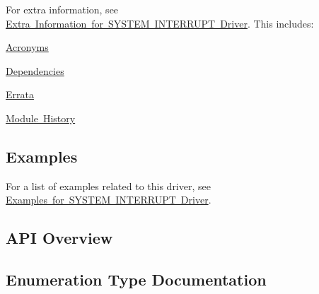For extra information, see \mbox{\hyperlink{asfdoc_sam0_system_interrupt_extra}{Extra Information for S\+Y\+S\+T\+EM I\+N\+T\+E\+R\+R\+U\+PT Driver}}. This includes\+:
\begin{DoxyItemize}
\item \mbox{\hyperlink{asfdoc_sam0_system_interrupt_extra_asfdoc_sam0_system_interrupt_extra_acronyms}{Acronyms}}
\item \mbox{\hyperlink{asfdoc_sam0_system_interrupt_extra_asfdoc_sam0_system_interrupt_extra_dependencies}{Dependencies}}
\item \mbox{\hyperlink{asfdoc_sam0_system_interrupt_extra_asfdoc_sam0_system_interrupt_extra_errata}{Errata}}
\item \mbox{\hyperlink{asfdoc_sam0_system_interrupt_extra_asfdoc_sam0_system_interrupt_extra_history}{Module History}}
\end{DoxyItemize}\hypertarget{group__asfdoc__sam0__system__interrupt__group_asfdoc_sam0_system_interrupt_examples}{}\subsection{Examples}\label{group__asfdoc__sam0__system__interrupt__group_asfdoc_sam0_system_interrupt_examples}
For a list of examples related to this driver, see \mbox{\hyperlink{asfdoc_sam0_system_interrupt_exqsg}{Examples for S\+Y\+S\+T\+EM I\+N\+T\+E\+R\+R\+U\+PT Driver}}.\hypertarget{group__asfdoc__sam0__system__interrupt__group_asfdoc_sam0_system_interrupt_api_overview}{}\subsection{A\+P\+I Overview}\label{group__asfdoc__sam0__system__interrupt__group_asfdoc_sam0_system_interrupt_api_overview}


\subsection{Enumeration Type Documentation}
\mbox{\label{group__asfdoc__sam0__system__interrupt__group_ga6d21907577ff204de7f5fa4642c84589}} 
